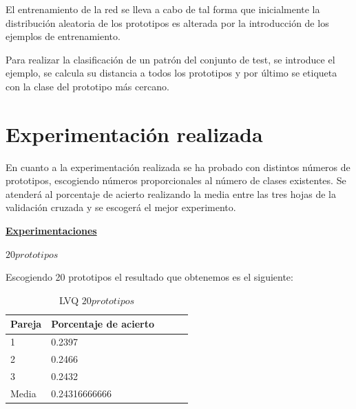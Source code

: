 \documentclass[11pt,spanish,listoffigures,listoftables]{workluis}
\begin{document}
\par El entrenamiento de la red se lleva a cabo de tal forma que inicialmente la distribución aleatoria de los prototipos es alterada por la introducción de los ejemplos de entrenamiento.

\par Para realizar la clasificación de un patrón del conjunto de test, se introduce el ejemplo, se calcula su distancia a todos los prototipos y por último se etiqueta con la clase del prototipo más cercano.

\section{Experimentación realizada}

\par En cuanto a la experimentación realizada se ha probado con distintos números de prototipos, escogiendo números proporcionales al número de clases existentes. Se atenderá al porcentaje de acierto realizando la media entre las tres hojas de la validación cruzada y se escogerá el mejor experimento.


\par \underline{\textbf{Experimentaciones}}


\par \textbf{$20 prototipos$}

\par Escogiendo 20 prototipos el resultado que obtenemos es el siguiente:

\begin{table}[H]
\centering
\caption{LVQ $20 prototipos$}
\label{tb:tb21}
\begin{tabular}{lllll}
\hline
\multicolumn{1}{|l|}{Pareja} & Porcentaje de acierto \\ \hline \hline
1                            & 0.2397			     \\
2                            & 0.2466			     \\
3                            & 0.2432			     \\
Media                        & 0.24316666666         \\ \hline
\end{tabular}
\end{table}
\end{document}

